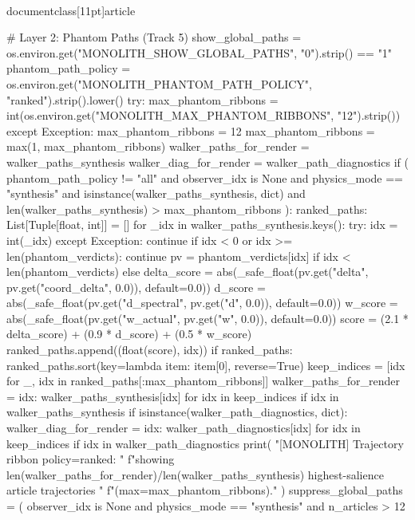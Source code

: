 \\documentclass[11pt]{article}
\begin{document}
\begin{CodeBlock}
{{{{{    # Layer 2: Phantom Paths (Track 5)
    show_global_paths = os.environ.get("MONOLITH_SHOW_GLOBAL_PATHS", "0").strip() == "1"
    phantom_path_policy = os.environ.get("MONOLITH_PHANTOM_PATH_POLICY", "ranked").strip().lower()
    try:
        max_phantom_ribbons = int(os.environ.get("MONOLITH_MAX_PHANTOM_RIBBONS", "12").strip())
    except Exception:
        max_phantom_ribbons = 12
    max_phantom_ribbons = max(1, max_phantom_ribbons)
    walker_paths_for_render = walker_paths_synthesis
    walker_diag_for_render = walker_path_diagnostics
    if (
        phantom_path_policy != "all"
        and observer_idx is None
        and physics_mode == "synthesis"
        and isinstance(walker_paths_synthesis, dict)
        and len(walker_paths_synthesis) > max_phantom_ribbons
    ):
        ranked_paths: List[Tuple[float, int]] = []
        for _idx in walker_paths_synthesis.keys():
            try:
                idx = int(_idx)
            except Exception:
                continue
            if idx < 0 or idx >= len(phantom_verdicts):
                continue
            pv = phantom_verdicts[idx] if idx < len(phantom_verdicts) else {}
            delta_score = abs(_safe_float(pv.get("delta", pv.get("coord_delta", 0.0)), default=0.0))
            d_score = abs(_safe_float(pv.get("d_spectral", pv.get("d", 0.0)), default=0.0))
            w_score = abs(_safe_float(pv.get("w_actual", pv.get("w", 0.0)), default=0.0))
            score = (2.1 * delta_score) + (0.9 * d_score) + (0.5 * w_score)
            ranked_paths.append((float(score), idx))
        if ranked_paths:
            ranked_paths.sort(key=lambda item: item[0], reverse=True)
            keep_indices = [idx for _, idx in ranked_paths[:max_phantom_ribbons]]
            walker_paths_for_render = {
                idx: walker_paths_synthesis[idx]
                for idx in keep_indices
                if idx in walker_paths_synthesis
            }
            if isinstance(walker_path_diagnostics, dict):
                walker_diag_for_render = {
                    idx: walker_path_diagnostics[idx]
                    for idx in keep_indices
                    if idx in walker_path_diagnostics
                }
            print(
                "[MONOLITH] Trajectory ribbon policy=ranked: "
                f"showing {len(walker_paths_for_render)}/{len(walker_paths_synthesis)} highest-salience article trajectories "
                f"(max={max_phantom_ribbons})."
            )
    suppress_global_paths = (
        observer_idx is None
        and physics_mode == "synthesis"
        and n_articles > 12
}}}}}
\end{CodeBlock}
\end{document}
